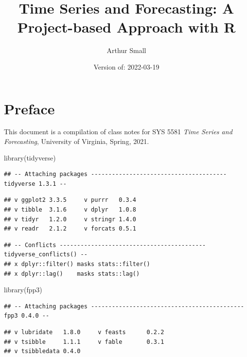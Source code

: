 \documentclass[
]{book}
\title{Time Series and Forecasting:
A Project-based Approach with R}
\author{Arthur Small}
\date{Version of: 2022-03-19}
\newenvironment{Shaded}{\begin{snugshade}}{\end{snugshade}}
\newcommand{\FunctionTok}[1]{\textcolor[rgb]{0.00,0.00,0.00}{#1}}
\newcommand{\NormalTok}[1]{#1}
\begin{document}
\maketitle

{
\setcounter{tocdepth}{1}
\tableofcontents
}
\hypertarget{preface}{%
\chapter*{Preface}\label{preface}}

This document is a compilation of class notes for SYS 5581 \emph{Time Series and Forecasting}, University of Virginia, Spring, 2021.

\begin{Shaded}
\begin{Highlighting}[]
\FunctionTok{library}\NormalTok{(tidyverse)}
\end{Highlighting}
\end{Shaded}

\begin{verbatim}
## -- Attaching packages --------------------------------------- tidyverse 1.3.1 --
\end{verbatim}

\begin{verbatim}
## v ggplot2 3.3.5     v purrr   0.3.4
## v tibble  3.1.6     v dplyr   1.0.8
## v tidyr   1.2.0     v stringr 1.4.0
## v readr   2.1.2     v forcats 0.5.1
\end{verbatim}

\begin{verbatim}
## -- Conflicts ------------------------------------------ tidyverse_conflicts() --
## x dplyr::filter() masks stats::filter()
## x dplyr::lag()    masks stats::lag()
\end{verbatim}

\begin{Shaded}
\begin{Highlighting}[]
\FunctionTok{library}\NormalTok{(fpp3)}
\end{Highlighting}
\end{Shaded}

\begin{verbatim}
## -- Attaching packages -------------------------------------------- fpp3 0.4.0 --
\end{verbatim}

\begin{verbatim}
## v lubridate   1.8.0     v feasts      0.2.2
## v tsibble     1.1.1     v fable       0.3.1
## v tsibbledata 0.4.0
\end{verbatim}
\end{document}
